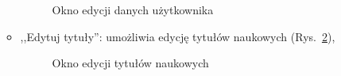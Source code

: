 \begin{itemize}
\begin{itemize}
\begin{figure}[!htb]
\centering 		
  \hspace{2mm}
\caption{Okno edycji danych użytkownika} 	
\label{editUser}
\end{figure}

\item ,,Edytuj tytuły'': umożliwia edycję tytułów naukowych (Rys.~\ref{editTitle}),

\begin{figure}[!htb]
\centering 		
  \hspace{2mm}
\caption{Okno edycji tytułów naukowych} 	
\label{editTitle}
\end{figure}


\end{itemize}
\end{itemize}
